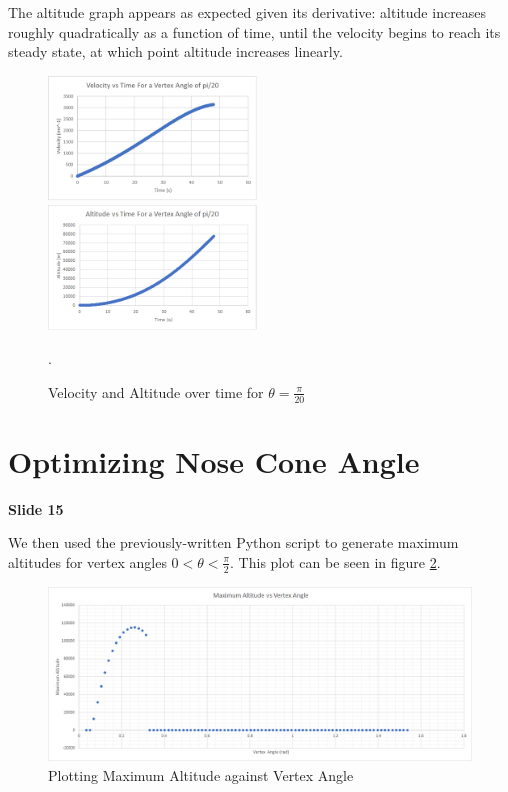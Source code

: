 \documentclass[]{article}
\begin{document}
The altitude graph appears as expected given its derivative: altitude increases roughly quadratically as a function of time, until the velocity begins to reach its steady state, at which point altitude increases linearly.


\begin{figure}[h]
	\centering
	\includegraphics[width=0.495\textwidth]{velocity.png}
	\includegraphics[width=0.495\textwidth]{altitude}
	\caption{Velocity and Altitude over time for $\theta = \frac{\pi}{20}$}.
	\label{velalt}
\end{figure}


\section{Optimizing Nose Cone Angle}

\textbf{Slide 15}

We then used the previously-written Python script to generate maximum altitudes for vertex angles $0<\theta<\frac{\pi}{2}$. This plot can be seen in figure \ref{optimization}.

\begin{figure}[h]
	\begin{center}
		\caption{Plotting Maximum Altitude against Vertex Angle}
		\label{optimization}
		\includegraphics[scale=0.5]{optimization.png}
	\end{center}
\end{figure}
\end{document}
